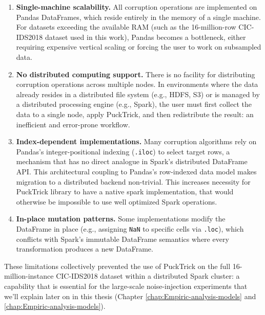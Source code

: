\documentclass[../main.tex]{subfiles}
\begin{document}
\begin{enumerate}
    \item \textbf{Single-machine scalability.}  All corruption operations are
          implemented on Pandas DataFrames, which reside entirely in the
          memory of a single machine.  For datasets exceeding the available
          RAM (such as the 16-million-row CIC-IDS2018 dataset used in this
          work), Pandas becomes a bottleneck, either requiring expensive
          vertical scaling or forcing the user to work on subsampled data.

    \item \textbf{No distributed computing support.}  There is no facility
          for distributing corruption operations across multiple nodes.  In
          environments where the data already resides in a distributed file
          system (e.g., HDFS, S3) or is managed by a distributed processing
          engine (e.g., Spark), the user must first collect the data to a
          single node, apply PuckTrick, and then redistribute the result: an
          inefficient and error-prone workflow.

    \item \textbf{Index-dependent implementations.}  Many corruption
          algorithms rely on Pandas's integer-positional indexing
          (\texttt{.iloc}) to select target rows, a mechanism that has no
          direct analogue in Spark's distributed DataFrame API.  This
          architectural coupling to Pandas's row-indexed data model
          makes migration to a distributed backend non-trivial. This increases necessity for PuckTrick library to have a native spark implementation, that would otherwise be impossible to use well optimized Spark operations. 

    \item \textbf{In-place mutation patterns.}  Some implementations modify
          the DataFrame in place (e.g., assigning \texttt{NaN} to specific
          cells via \texttt{.loc}), which conflicts with Spark's immutable
          DataFrame semantics where every transformation produces a new
          DataFrame.
\end{enumerate}

These limitations collectively prevented the use of PuckTrick on the full
16-million-instance CIC-IDS2018 dataset within a distributed Spark cluster: 
a capability that is essential for the large-scale noise-injection experiments that we'll explain later on in this thesis (Chapter \ref{chap:Empiric-analysis-models} and \ref{chap:Empiric-analysis-models}).  
\end{document}
